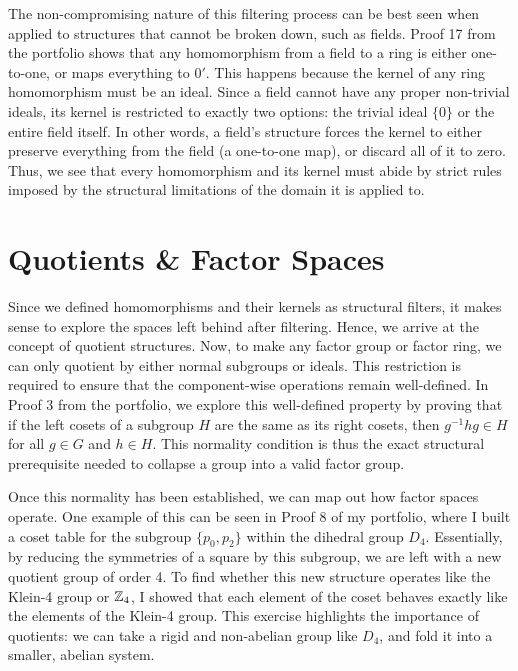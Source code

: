 The non-compromising nature of this filtering process can be best seen when applied to structures that cannot be broken down, such as fields. Proof 17 from the portfolio shows that any homomorphism from a field to a ring is either one-to-one, or maps everything to \(0'\). This happens because the kernel of any ring homomorphism must be an ideal. Since a field cannot have any proper non-trivial ideals, its kernel is restricted to exactly two options: the trivial ideal \(\{0\}\) or the entire field itself. In other words, a field's structure forces the kernel to either preserve everything from the field (a one-to-one map), or discard all of it to zero. Thus, we see that every homomorphism and its kernel must abide by strict rules imposed by the structural limitations of the domain it is applied to.  

\section{Quotients \& Factor Spaces}

Since we defined homomorphisms and their kernels as structural filters, it makes sense to explore the spaces left behind after filtering. Hence, we arrive at the concept of quotient structures. Now, to make any factor group or factor ring, we can only quotient by either normal subgroups or ideals. This restriction is required to ensure that the component-wise operations remain well-defined. In Proof 3 from the portfolio, we explore this well-defined property by proving that if the left cosets of a subgroup \(H\) are the same as its right cosets, then \(g^{-1}hg \in H\) for all \(g \in G\) and \(h \in H\). This normality condition is thus the exact structural prerequisite needed to collapse a group into a valid factor group.

Once this normality has been established, we can map out how factor spaces operate. One example of this can be seen in Proof 8 of my portfolio, where I built a coset table for the subgroup \(\{p_{0}, p_{2}\}\) within the dihedral group \(D_{4}\). Essentially, by reducing the symmetries of a square by this subgroup, we are left with a new quotient group of order 4. To find whether this new structure operates like the Klein-4 group or \(\mathbb{Z}_{4}\), I showed that each element of the coset behaves exactly like the elements of the Klein-4 group. This exercise highlights the importance of quotients: we can take a rigid and non-abelian group like \(D_{4}\), and fold it into a smaller, abelian system.

